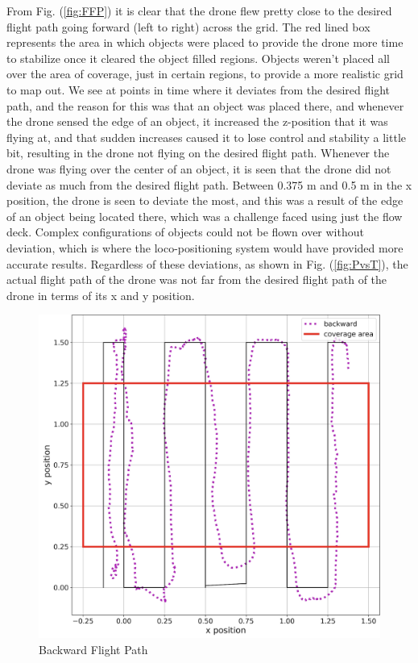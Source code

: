 From Fig. (\ref{fig:FFP}) it is clear that the drone flew pretty close to the desired flight path going forward (left to right) across the grid. The red lined box represents the area in which objects were placed to provide the drone more time to stabilize once it cleared the object filled regions. Objects weren't placed all over the area of coverage, just in certain regions, to provide a more realistic grid to map out. We see at points in time where it deviates from the desired flight path, and the reason for this was that an object was placed there, and whenever the drone sensed the edge of an object, it increased the z-position that it was flying at, and that sudden increases caused it to lose control and stability a little bit, resulting in the drone not flying on the desired flight path. Whenever the drone was flying over the center of an object, it is seen that the drone did not deviate as much from the desired flight path. Between 0.375 m and 0.5 m in the x position, the drone is seen to deviate the most, and this was a result of the edge of an object being located there, which was a challenge faced using just the flow deck. Complex configurations of objects could not be flown over without deviation, which is where the loco-positioning system would have provided more accurate results. Regardless of these deviations, as shown in Fig. (\ref{fig:PvsT}), the actual flight path of the drone was not far from the desired flight path of the drone in terms of its x and y position. 

\begin{figure}[H]
  \centering
  \includegraphics[width=0.7\linewidth, height=0.7\linewidth]{R&D/BFP.png}  
  \caption{Backward Flight Path}
  \label{fig:BFP}
\end{figure}

